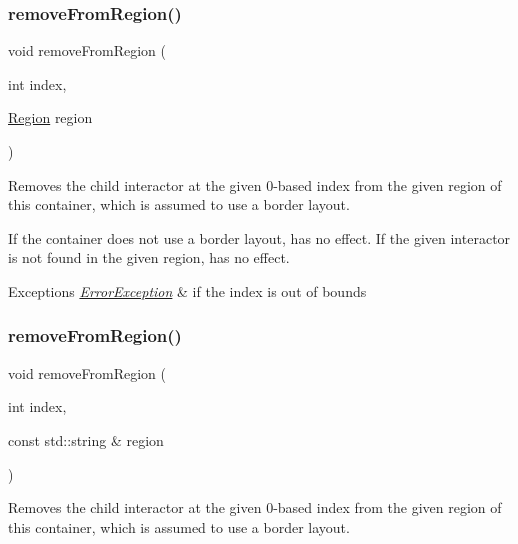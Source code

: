 \subsubsection{\texorpdfstring{remove\+From\+Region()}{removeFromRegion()}\hspace{0.1cm}{\footnotesize\ttfamily [5/6]}}
{\footnotesize\ttfamily void remove\+From\+Region (\begin{DoxyParamCaption}\item[{int}]{index,  }\item[{\mbox{\hyperlink{classGContainer_a81a01a86de31071a92e6cce0bab9bc4b}{Region}}}]{region }\end{DoxyParamCaption})\hspace{0.3cm}{\ttfamily [virtual]}}



Removes the child interactor at the given 0-\/based index from the given region of this container, which is assumed to use a border layout. 

If the container does not use a border layout, has no effect. If the given interactor is not found in the given region, has no effect. 
\begin{DoxyExceptions}{Exceptions}
{\em \mbox{\hyperlink{classErrorException}{Error\+Exception}}} & if the index is out of bounds \\
\hline
\end{DoxyExceptions}
\mbox{\label{classGContainer_ac839e32fec6ea6b37f6c6da8aa6ce43b}} 
\subsubsection{\texorpdfstring{remove\+From\+Region()}{removeFromRegion()}\hspace{0.1cm}{\footnotesize\ttfamily [6/6]}}
{\footnotesize\ttfamily void remove\+From\+Region (\begin{DoxyParamCaption}\item[{int}]{index,  }\item[{const std\+::string \&}]{region }\end{DoxyParamCaption})\hspace{0.3cm}{\ttfamily [virtual]}}



Removes the child interactor at the given 0-\/based index from the given region of this container, which is assumed to use a border layout. 

